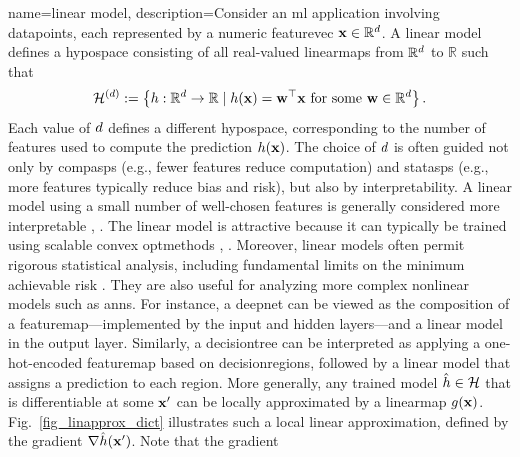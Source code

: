 {name={linear model}, 
	description={Consider an \gls{ml} application involving \glspl{datapoint}, each represented 
		by a numeric \gls{featurevec} ${\bf x} \in \mathbb{R}^{d}$. A linear \gls{model} defines 
		a \gls{hypospace} consisting of all real-valued \glspl{linearmap} from $\mathbb{R}^{d}$ to $\mathbb{R}$ such that
		\begin{equation}
			\nonumber
			\label{equ_def_lin_model_hypspace_dict}
			\mathcal{H}^{(d)} := \left\{ h: \mathbb{R}^{d} \rightarrow \mathbb{R} \mid h({\bf x}) = {\bf w}^{\top} {\bf x} \text{ for some } {\bf w} \in \mathbb{R}^{d} \right\}.
		\end{equation}
		Each value of $d$ defines a different \gls{hypospace}, corresponding to the number of 
		\glspl{feature} used to compute the \gls{prediction} $h({\bf x})$. The choice of 
		$d$ is often guided not only by \glspl{compasp} (e.g., fewer \glspl{feature} reduce computation) and 
		\glspl{statasp} (e.g., more \glspl{feature} typically reduce \gls{bias} and \gls{risk}), but also by \gls{interpretability}. 
		A linear \gls{model} using a small number of well-chosen \glspl{feature} is generally considered 
		more interpretable \cite{rudin2019stop}, \cite{Ribeiro2016}.
		The linear \gls{model} is attractive because it can typically be trained using scalable \gls{convex} 
		\glspl{optmethod} \cite{BertsekasNonLinProgr}, \cite{hastie01statisticallearning}. 
		Moreover, linear \glspl{model} often permit rigorous 
		statistical analysis, including fundamental limits on the \gls{minimum} achievable \gls{risk} \cite{Wain2019}. 
		They are also useful for analyzing more complex nonlinear \glspl{model} such as \glspl{ann}. For instance, 
		a \gls{deepnet} can be viewed as the composition of a \gls{featuremap}—implemented by the input and 
		hidden \glspl{layer}—and a linear \gls{model} in the \gls{output} \gls{layer}. Similarly, a \gls{decisiontree} can be interpreted 
		as applying a one-hot-encoded \gls{featuremap} based on \glspl{decisionregion}, followed by a linear 
		\gls{model} that assigns a \gls{prediction} to each region.
		More generally, any trained \gls{model} $\hat{h} \in \mathcal{H}$ that is 
		\gls{differentiable} at some ${\bf x}'$ can be locally approximated by a \gls{linearmap} 
		$g({\bf x})$. Fig.\ \ref{fig_linapprox_dict} illustrates such a local linear approximation, 
		defined by the \gls{gradient} $\nabla \hat{h}({\bf x}')$. Note that the \gls{gradient} 
}}
